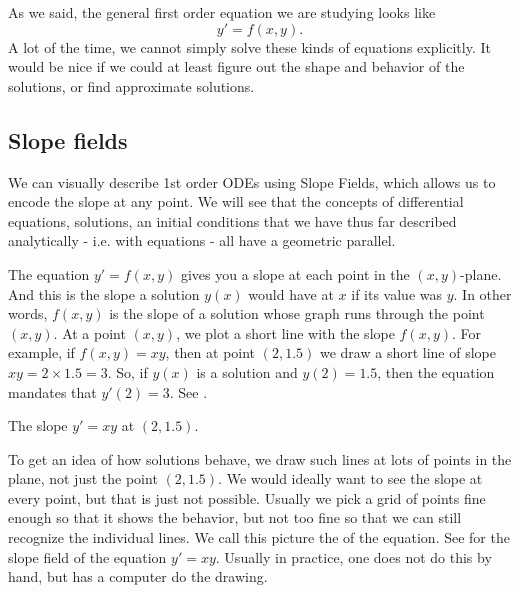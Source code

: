 %

As we said, the general first order equation we are studying looks like
\begin{equation*}
y' = f(x,y).
\end{equation*}
A lot of the time, we cannot simply solve these kinds of equations explicitly.
It would be nice if we could at least figure out the shape and behavior of
the solutions, or find approximate solutions.


\subsection{Slope fields}

\begin{video}
	We can visually describe 1st order ODEs using Slope Fields, which allows us to encode the slope at any point. We will see that the concepts of differential equations, solutions, an initial conditions that we have thus far described analytically - i.e. with equations - all have a geometric parallel.
\end{video}



The equation $y' = f(x,y)$
gives you a slope at each point 
in the
$(x,y)$-plane.  And this is the slope a solution $y(x)$ would have 
at $x$ if its value was $y$.  In other words, $f(x,y)$ is the slope
of a solution whose graph runs through the
point $(x,y)$.  At a point $(x,y)$, we plot a short line
with the slope $f(x,y)$.
For example, if $f(x,y) = xy$, then at point $(2,1.5)$ we draw a
short line of slope $xy = 2 \times 1.5 = 3$.  So, if $y(x)$ is a solution
and $y(2) = 1.5$, then the equation mandates that $y'(2) = 3$.
See .

\begin{myfig}
\capstart
{}
\caption{The slope $y'=xy$ at $(2,1.5)$.\label{1.3:fig0}}
\end{myfig}

To get an idea of how solutions behave, we draw such lines at lots
of points in the plane, not just the point $(2,1.5)$.  We would
ideally want to see the slope at every point, but that is
just not possible.  Usually we pick a
grid of points fine enough so that it shows the behavior, but not too
fine so that we can still recognize the individual lines.
We call this picture the \emph{} of the equation.
See  for the slope field of the equation $y' = xy$.
Usually in practice, one does not do this by hand, but has a computer do the
drawing.

